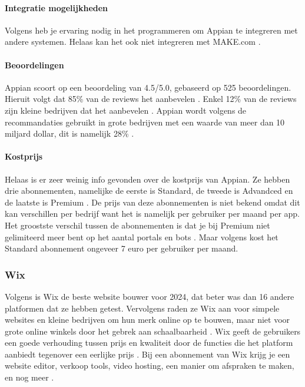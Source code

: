 \paragraph{Integratie mogelijkheden}
Volgens \textcite{Marvin2017} heb je ervaring nodig in het programmeren om Appian te integreren met andere systemen. 
Helaas kan het ook niet integreren met MAKE.com \autocite{MAKE.com2024a}.

\paragraph{Beoordelingen}
Appian scoort op \textcite{Gartner2024} een beoordeling van 4.5/5.0, gebaseerd op 525 beoordelingen. Hieruit volgt dat 85\% van de reviews het aanbevelen \autocite{Gartner2024}.
Enkel 12\% van de reviews zijn kleine bedrijven dat het aanbevelen \autocite{Gartner2024}. Appian wordt volgens de recommandaties gebruikt in grote bedrijven met een waarde van meer dan 10 miljard dollar, dit is namelijk 28\% \autocite{Gartner2024}.
\paragraph{Kostprijs}
Helaas is er zeer weinig info gevonden over de kostprijs van Appian. Ze hebben drie abonnementen, namelijke de eerste is 
Standard, de tweede is Advandced en de laatste is Premium \autocite{Appian2024}. De prijs van deze abonnementen is niet bekend omdat dit kan verschillen per bedrijf want het is namelijk 
per gebruiker per maand per app. Het groostste verschil tussen de abonnementen is dat je bij Premium niet gelimiteerd meer bent op het aantal portals en bots \autocite{Appian2024}. Maar volgens
\textcite{Shala} kost het Standard abonnement ongeveer 7 euro per gebruiker per maand.


\subsubsection*{Wix}
Volgens \textcite{Ryan2024} is Wix de beste website bouwer voor 2024, dat beter was dan 16 andere platformen dat ze hebben getest. Vervolgens raden ze 
Wix aan voor simpele websites en kleine bedrijven om hun merk online op te bouwen, maar niet voor grote online winkels door het gebrek aan schaalbaarheid \autocite{Ryan2024}.
Wix geeft de gebruikers een goede verhouding tussen prijs en kwaliteit door de functies die het platform aanbiedt tegenover een eerlijke prijs  \autocite{Singleton2024}.
Bij een abonnement van Wix krijg je een website editor, verkoop tools, video hosting, een manier om afspraken te maken, en nog meer \autocite{Singleton2024}.
